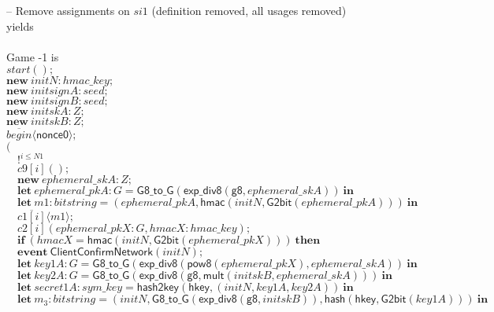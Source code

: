 \documentclass{article}
\newcommand{\cinput}[2]{{#1}({#2})}
\newcommand{\coutput}[2]{\overline{#1}\langle{#2}\rangle}
\newcommand{\kw}[1]{\mathbf{#1}}
\newcommand{\kwf}[1]{\mathsf{#1}}
\newcommand{\var}[1]{\mathit{#1}}
\newcommand{\kwt}[1]{\mathit{#1}}
\newcommand{\kwp}[1]{\mathit{#1}}
\newcommand{\kwc}[1]{\mathit{#1}}
\begin{document}
\begin{tabbing}
\quad -- Remove assignments on $\var{si1}$ (definition removed, all usages removed)\\
yields\\
\\
Game -1 is\\
\>$\cinput{\kwc{start}}{};$\\
\>$\kw{new}\ \var{initN}: \kwt{hmac{\_}key};$\\
\>$\kw{new}\ \var{initsignA}: \kwt{seed};$\\
\>$\kw{new}\ \var{initsignB}: \kwt{seed};$\\
\>$\kw{new}\ \var{initskA}: \kwt{Z};$\\
\>$\kw{new}\ \var{initskB}: \kwt{Z};$\\
\>$\coutput{\kwc{begin}}{\kwf{nonce0}};$\\
\>$($\\
\>$\quad !^{\var{i} \leq \kwp{N1}}$\\
\>$\quad \cinput{\kwc{c9}[\var{i}]}{};$\\
\>$\quad \kw{new}\ \var{ephemeral{\_}skA}: \kwt{Z};$\\
\>$\quad \kw{let}\ \var{ephemeral{\_}pkA}: \kwt{G} = \kwf{G8{\_}to{\_}G}(\kwf{exp{\_}div8}(\kwf{g8}, \var{ephemeral{\_}skA}))\ \kw{in}$\\
\>$\quad \kw{let}\ \var{m1}: \kwt{bitstring} = \kwf{}(\var{ephemeral{\_}pkA}, \kwf{hmac}(\var{initN}, \kwf{G2bit}(\var{ephemeral{\_}pkA})))\ \kw{in}$\\
\>$\quad \coutput{\kwc{c1}[\var{i}]}{\var{m1}};$\\
\>$\quad \cinput{\kwc{c2}[\var{i}]}{\var{ephemeral{\_}pkX}: \kwt{G}, \var{hmacX}: \kwt{hmac{\_}key}};$\\
\>$\quad \kw{if}\ (\var{hmacX}  =  \kwf{hmac}(\var{initN}, \kwf{G2bit}(\var{ephemeral{\_}pkX})))\ \kw{then}$\\
\>$\quad \kw{event}\ \kwf{ClientConfirmNetwork}(\var{initN});$\\
\>$\quad \kw{let}\ \var{key1A}: \kwt{G} = \kwf{G8{\_}to{\_}G}(\kwf{exp{\_}div8}(\kwf{pow8}(\var{ephemeral{\_}pkX}), \var{ephemeral{\_}skA}))\ \kw{in}$\\
\>$\quad \kw{let}\ \var{key2A}: \kwt{G} = \kwf{G8{\_}to{\_}G}(\kwf{exp{\_}div8}(\kwf{g8}, \kwf{mult}(\var{initskB}, \var{ephemeral{\_}skA})))\ \kw{in}$\\
\>$\quad \kw{let}\ \var{secret1A}: \kwt{sym{\_}key} = \kwf{hash2key}(\kwf{hkey}, \kwf{}(\var{initN}, \var{key1A}, \var{key2A}))\ \kw{in}$\\
\>$\quad \kw{let}\ \var{m}_{3}: \kwt{bitstring} = \kwf{}(\var{initN}, \kwf{G8{\_}to{\_}G}(\kwf{exp{\_}div8}(\kwf{g8}, \var{initskB})), \kwf{hash}(\kwf{hkey}, \kwf{G2bit}(\var{key1A})))\ \kw{in}$\\

\end{tabbing}
\end{document}
